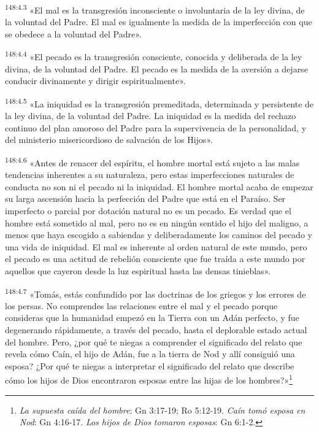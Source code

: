 \par
\textsuperscript{148:4.3} «El mal es la transgresión inconsciente o involuntaria de la ley divina, de la voluntad del Padre. El mal es igualmente la medida de la imperfección con que se obedece a la voluntad del Padre».

\par
\textsuperscript{148:4.4} «El pecado es la transgresión consciente, conocida y deliberada de la ley divina, de la voluntad del Padre. El pecado es la medida de la aversión a dejarse conducir divinamente y dirigir espiritualmente».

\par
\textsuperscript{148:4.5} «La iniquidad es la transgresión premeditada, determinada y persistente de la ley divina, de la voluntad del Padre. La iniquidad es la medida del rechazo continuo del plan amoroso del Padre para la supervivencia de la personalidad, y del ministerio misericordioso de salvación de los Hijos».

\par
\textsuperscript{148:4.6} «Antes de renacer del espíritu, el hombre mortal está sujeto a las malas tendencias inherentes a su naturaleza, pero estas imperfecciones naturales de conducta no son ni el pecado ni la iniquidad. El hombre mortal acaba de empezar su larga ascensión hacia la perfección del Padre que está en el Paraíso. Ser imperfecto o parcial por dotación natural no es un pecado. Es verdad que el hombre está sometido al mal, pero no es en ningún sentido el hijo del maligno, a menos que haya escogido a sabiendas y deliberadamente los caminos del pecado y una vida de iniquidad. El mal es inherente al orden natural de este mundo, pero el pecado es una actitud de rebelión consciente que fue traída a este mundo por aquellos que cayeron desde la luz espiritual hasta las densas tinieblas».

\par
\textsuperscript{148:4.7} «Tomás, estás confundido por las doctrinas de los griegos y los errores de los persas. No comprendes las relaciones entre el mal y el pecado porque consideras que la humanidad empezó en la Tierra con un Adán perfecto, y fue degenerando rápidamente, a través del pecado, hasta el deplorable estado actual del hombre. Pero, ¿por qué te niegas a comprender el significado del relato que revela cómo Caín, el hijo de Adán, fue a la tierra de Nod y allí consiguió una esposa? ¿Por qué te niegas a interpretar el significado del relato que describe cómo los hijos de Dios encontraron esposas entre las hijas de los hombres?»\footnote{\textit{La supuesta caída del hombre}: Gn 3:17-19; Ro 5:12-19. \textit{Caín tomó esposa en Nod}: Gn 4:16-17. \textit{Los hijos de Dios tomaron esposas}: Gn 6:1-2.}

